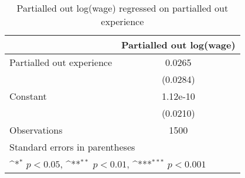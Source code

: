 \begin{table}[htbp]\centering
\def\sym#1{\ifmmode^{#1}\else\(^{#1}\)\fi}
\caption{Partialled out log(wage) regressed on partialled out experience}
\begin{tabular}{l*{1}{c}}
\hline\hline
                    &\multicolumn{1}{c}{Partialled out log(wage)}\\
\hline
Partialled out experience&      0.0265         \\
                    &    (0.0284)         \\
[1em]
Constant            &    1.12e-10         \\
                    &    (0.0210)         \\
\hline
Observations        &        1500         \\
\hline\hline
\multicolumn{2}{l}{\footnotesize Standard errors in parentheses}\\
\multicolumn{2}{l}{\footnotesize \sym{*} \(p<0.05\), \sym{**} \(p<0.01\), \sym{***} \(p<0.001\)}\\
\end{tabular}
\end{table}
